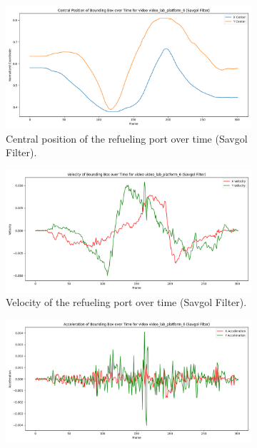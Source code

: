 \documentclass[12pt,oneside]{book} %
\begin{document}
\begin{figure}[H]
    \centering
    \begin{subfigure}[t]{0.45\textwidth}
        \includegraphics[width=\textwidth]{figures/bbox_metrics/video_lab_platform_6 (Savgol Filter)_central_position.png}
        \caption{Central position of the refueling port over time (Savgol Filter).}
        \label{fig:central-position-test-video_lab_platform_6-savgol}
    \end{subfigure}
    \hfill
    \begin{subfigure}[t]{0.45\textwidth}
        \includegraphics[width=\textwidth]{figures/bbox_metrics/video_lab_platform_6 (Savgol Filter)_velocity.png}
        \caption{Velocity of the refueling port over time (Savgol Filter).}
        \label{fig:velocity-test-video_lab_platform_6-savgol}
    \end{subfigure}
    \vfill
    \begin{subfigure}[t]{0.45\textwidth}
        \includegraphics[width=\textwidth]{figures/bbox_metrics/video_lab_platform_6 (Savgol Filter)_acceleration.png}

\end{subfigure}
\end{figure}
\end{document}
